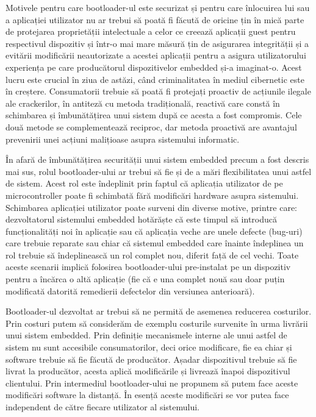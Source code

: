 \documentclass[12pt,a4paper,titlepage]{report}
\begin{document}
Motivele pentru care bootloader-ul este securizat și pentru care înlocuirea lui sau a aplicației utilizator
nu ar trebui să poată fi făcută de oricine țin în mică parte de protejarea proprietății intelectuale a celor ce creează aplicații guest pentru respectivul dispozitiv și într-o mai mare măsură țin de asigurarea integrității și a evitării modificării neautorizate a acestei aplicații pentru a asigura utilizatorului experiența pe care producătorul dispozitivelor embedded și-a imaginat-o. Acest lucru este crucial în ziua de astăzi, când criminalitatea în mediul cibernetic este în creștere\cite{interpol}\cite{morgan2016}. Consumatorii trebuie să poată fi protejați proactiv de acțiunile ilegale ale crackerilor, în antiteză cu metoda tradițională, reactivă care constă în schimbarea și îmbunătățirea unui sistem după ce acesta a fost compromis. Cele două metode se complementează reciproc, dar metoda proactivă are avantajul prevenirii unei acțiuni malițioase asupra sistemului informatic.

În afară de îmbunătățirea securității unui sistem embedded precum a fost descris mai sus, rolul bootloader-ului ar trebui să fie și de a mări flexibilitatea unui astfel de sistem. Acest rol este îndeplinit prin faptul că aplicația utilizator de pe microcontroller poate fi schimbată fără modificări hardware asupra sistemului. Schimbarea aplicației utilizator poate surveni din diverse motive, printre care: dezvoltatorul sistemului embedded hotărăște că este timpul să introducă funcționalități noi în aplicație sau că aplicația veche are unele defecte (bug-uri) care trebuie reparate sau chiar că sistemul embedded care înainte îndeplinea un rol trebuie să îndeplinească un rol complet nou, diferit față de cel vechi. Toate aceste scenarii implică folosirea bootloader-ului pre-instalat pe un dispozitiv pentru a încărca o altă aplicație (fie că e una complet nouă sau doar puțin modificată datorită remedierii defectelor din versiunea anterioară).

Bootloader-ul dezvoltat ar trebui să ne permită de asemenea reducerea costurilor. Prin costuri putem să considerăm de exemplu costurile survenite în urma livrării unui sistem embedded. Prin definiție mecanismele interne ale unui astfel de sistem nu sunt accesibile consumatorilor, deci orice modificare, fie ea chiar și software trebuie să fie făcută de producător. Așadar dispozitivul trebuie să fie livrat la producător, acesta aplică modificările și livrează înapoi dispozitivul clientului. Prin intermediul bootloader-ului ne propunem să putem face aceste modificări software la distanță. În esență aceste modificări se vor putea face independent de către fiecare utilizator al sistemului.
\end{document}
